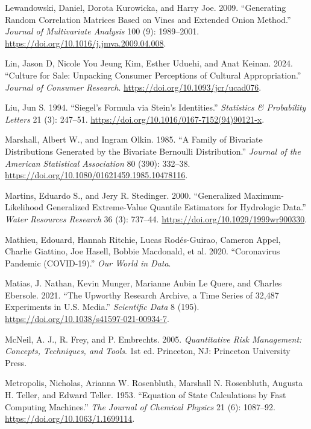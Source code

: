 \documentclass[
  11pt,
  letterpaper,
]{scrbook}
\newlength{\cslhangindent}
\newenvironment{CSLReferences}[2] %
 {\begin{list}{}{%
  \setlength{\itemindent}{0pt}
  \setlength{\leftmargin}{0pt}
  \setlength{\parsep}{0pt}
  \ifodd #1
   \setlength{\leftmargin}{\cslhangindent}
   \setlength{\itemindent}{-1\cslhangindent}
  \fi
  \setlength{\itemsep}{#2\baselineskip}}}
 {\end{list}}
\theoremstyle{plain}
\theoremstyle{plain}
\theoremstyle{plain}
\theoremstyle{definition}
\theoremstyle{definition}
\theoremstyle{definition}
\theoremstyle{remark}
\begin{document}
\begin{CSLReferences}{1}{0}
Lewandowski, Daniel, Dorota Kurowicka, and Harry Joe. 2009.
{``Generating Random Correlation Matrices Based on Vines and Extended
Onion Method.''} \emph{Journal of Multivariate Analysis} 100 (9):
1989--2001. \url{https://doi.org/10.1016/j.jmva.2009.04.008}.

Lin, Jason D, Nicole You Jeung Kim, Esther Uduehi, and Anat Keinan.
2024. {``Culture for Sale: Unpacking Consumer Perceptions of Cultural
Appropriation.''} \emph{Journal of Consumer Research}.
\url{https://doi.org/10.1093/jcr/ucad076}.

Liu, Jun S. 1994. {``{S}iegel's Formula via {S}tein's Identities.''}
\emph{Statistics \& Probability Letters} 21 (3): 247--51.
\url{https://doi.org/10.1016/0167-7152(94)90121-x}.

Marshall, Albert W., and Ingram Olkin. 1985. {``A Family of Bivariate
Distributions Generated by the Bivariate {B}ernoulli Distribution.''}
\emph{Journal of the American Statistical Association} 80 (390):
332--38. \url{https://doi.org/10.1080/01621459.1985.10478116}.

Martins, Eduardo S., and Jery R. Stedinger. 2000. {``Generalized
Maximum-Likelihood Generalized Extreme-Value Quantile Estimators for
Hydrologic Data.''} \emph{Water Resources Research} 36 (3): 737--44.
\url{https://doi.org/10.1029/1999wr900330}.

Mathieu, Edouard, Hannah Ritchie, Lucas Rodés-Guirao, Cameron Appel,
Charlie Giattino, Joe Hasell, Bobbie Macdonald, et al. 2020.
{``Coronavirus Pandemic (COVID-19).''} \emph{Our World in Data}.

Matias, J. Nathan, Kevin Munger, Marianne Aubin Le Quere, and Charles
Ebersole. 2021. {``The {U}pworthy {R}esearch {A}rchive, a Time Series of
32,487 Experiments in {U.S.} Media.''} \emph{Scientific Data} 8 (195).
\url{https://doi.org/10.1038/s41597-021-00934-7}.

McNeil, A. J., R. Frey, and P. Embrechts. 2005. \emph{Quantitative Risk
Management: Concepts, Techniques, and Tools}. 1st ed. Princeton, NJ:
Princeton University Press.

Metropolis, Nicholas, Arianna W. Rosenbluth, Marshall N. Rosenbluth,
Augusta H. Teller, and Edward Teller. 1953. {``Equation of State
Calculations by Fast Computing Machines.''} \emph{The Journal of
Chemical Physics} 21 (6): 1087--92.
\url{https://doi.org/10.1063/1.1699114}.


\end{CSLReferences}
\end{document}

